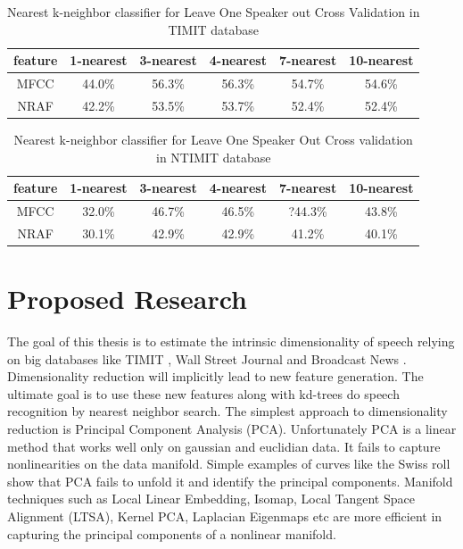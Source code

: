 \documentclass[12pt,letterpaper,doublespaced,ETD,dvips,proposal]{gtthesis}
\begin{document}
\begin{Body}
\begin{table}[!htb]
\footnotesize{ \centering
\begin{tabular}{|c|c|c|c|c|c|}
  \hline
  feature & 1-nearest & 3-nearest & 4-nearest & 7-nearest & 10-nearest \\
  \hline
  MFCC & 44.0\% & 56.3\% & 56.3\% & 54.7\% & 54.6\% \\
  NRAF & 42.2\% & 53.5\% & 53.7\% & 52.4\% & 52.4\% \\
  \hline
\end{tabular}
\caption{Nearest k-neighbor classifier for
  Leave One Speaker out Cross Validation in TIMIT database}
} \label{kneighborLOOCVTIMIT}
\end{table}

\begin{table}[!htb]
\footnotesize{ \centering
\begin{tabular}{|c|c|c|c|c|c|}
  \hline
  feature & 1-nearest & 3-nearest & 4-nearest & 7-nearest & 10-nearest \\
  \hline
  MFCC & 32.0\% & 46.7\% & 46.5\% & ?44.3\% & 43.8\% \\
  NRAF & 30.1\% & 42.9\% & 42.9\% & 41.2\% & 40.1\% \\
  \hline
\end{tabular}
  \caption{Nearest k-neighbor classifier for Leave One Speaker Out
  Cross validation in  NTIMIT database}
} \label{kneighborLOOCVNTIMIT}
\end{table}

\pagebreak
\newpage
\section{Proposed Research}
\label{proposed}
The goal of this thesis is to  estimate the intrinsic dimensionality of speech relying 
on big databases like TIMIT \cite{garofolo1993tap}, Wall Street Journal and Broadcast
News \cite{graff1997bns}. Dimensionality reduction will implicitly lead to new feature
generation. The ultimate goal is to use these new features along
with kd-trees do speech recognition by nearest neighbor search. The simplest approach to dimensionality 
reduction is Principal Component Analysis (PCA). Unfortunately PCA is a linear method that works well 
only on gaussian and euclidian data. It fails to capture nonlinearities on the data manifold. Simple 
examples of curves like the Swiss roll show that PCA fails to unfold it 
and identify the principal components. Manifold techniques such as Local Linear Embedding, Isomap, 
Local Tangent Space Alignment (LTSA), Kernel PCA, Laplacian Eigenmaps etc are more  efficient in capturing 
the principal components of a nonlinear manifold. 


\end{Body}
\end{document}
